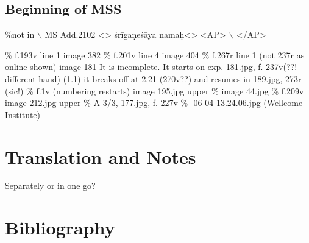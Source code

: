 \documentclass[11pt]{article}
\begin{document}
\subsection{Beginning of MSS}
\label{sec:orgf43c8cc}
\%not in \msCc$\backslash$ MS Add.2102
<> śrīgaṇeśāya namaḥ<>
	<AP> \vo \om$\backslash$ \mssCaCbCc</AP>

\% \msCa f.193v line 1                   image 382
\% \msCb f.201v line 4                   image 404
\% \msCc f.267r line 1 (not 237r as online shown) image 181
		It is incomplete. It starts on exp. 181.jpg, f. 237v(??! different hand) (1.1)
				it breaks off at 2.21 (270v??) and resumes in 189.jpg, 273r (sic!)
\% \msNa f.1v (numbering restarts) image 195.jpg upper
\% \msNb image 44.jpg 
\% \msNc f.209v image 212.jpg upper  
\% \msNd A 3/3, 177.jpg, f. 227v
\% -06-04 13.24.06.jpg (Wellcome Institute)
\section{Translation and Notes}
\label{sec:org568ba99}
Separately or in one go?
\section{Bibliography}
\label{sec:org71f678a}
\end{document}
